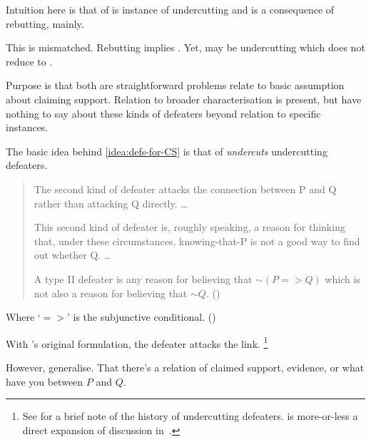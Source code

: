 \begin{note}
    Intuition here is that of \mistaken{} is instance of undercutting and \misled{} is a consequence of rebutting, mainly.

  This is mismatched.
  Rebutting implies \misled{}.
  Yet, may be undercutting which does not reduce to \mistaken{}.

  Purpose is that both are straightforward problems relate to basic assumption about claiming support.
  Relation to broader characterisation is present, but have nothing to say about these kinds of defeaters beyond relation to specific instances.
\end{note}

\begin{note}
  The basic idea behind \autoref{idea:defs-for-CS} is that of \emph{undercuts} undercutting defeaters.

  \begin{quote}
    The second kind of defeater attacks the connection between P and Q rather than attacking Q directly.
    \dots

    This second kind of defeater is, roughly speaking, a reason for thinking that, under these circumstances, knowing-that-P is not a good way to find out whether Q.
    \dots

    A type II defeater is any reason for believing that \({\sim}(P => Q)\) which is not also a reason for believing that \({\sim}Q\).\nolinebreak
    \mbox{}\hfill\mbox{(\cite[43]{Pollock:1974uk})}
  \end{quote}
  Where `\(=>\)' is the subjunctive conditional. (\Citeyear[42]{Pollock:1974uk})

  With \citeauthor{Pollock:1974uk}'s original formulation, the defeater attacks the link.\nolinebreak
  \footnote{
    See \textcite[196,fn.166]{Pollock:1999tm} for a brief note of the history of undercutting defeaters.
    \textcite{Pollock:1974uk} is more-or-less a direct expansion of discussion in~\textcite{Pollock:1970un}.
  }

  However, generalise.
  That there's a relation of claimed support, evidence, or what have you between \(P\) and \(Q\).


\end{note}
